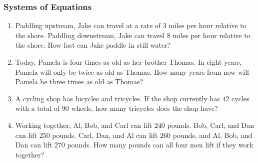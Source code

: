 \documentclass{article}
\begin{document}
    \subsubsection*{Systems of Equations}
    \begin{enumerate}[resume]
        \item Paddling upstream, Jake can travel at a rate of $3$ miles per hour
        relative to the shore. Paddling downstream, Jake can travel $8$ miles
        per hour relative to the shore. How fast can Jake paddle in still water?
        \vspace{3cm}
        \item Today, Pamela is four times as old as her brother Thomas. In eight
        years, Pamela will only be twice as old as Thomas. How many years from
        now will Pamela be three times as old as Thomas?
        \vspace{3cm}
        \item A cycling shop has bicycles and tricycles. If the shop currently
        has $42$ cycles with a total of $90$ wheels, how many tricycles does the
        shop have?
        \vspace{3cm}
        \item Working together, Al, Bob, and Carl can lift $240$ pounds. Bob,
        Carl, and Dan can lift $250$ pounds. Carl, Dan, and Al can lift $260$
        pounds, and Al, Bob, and Dan can lift $270$ pounds. How many pounds can
        all four men lift if they work together?
        \vspace{3cm}
    \end{enumerate}
\end{document}
